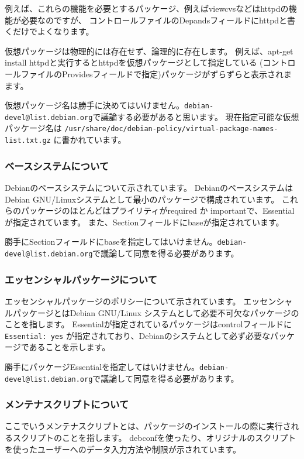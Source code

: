 \documentclass[mingoth,a4paper]{jsarticle}
\begin{document}
例えば、これらの機能を必要とするパッケージ、例えばviewcvsなどはhttpdの機能が必要なのですが、
コントロールファイルのDepandsフィールドにhttpdと書くだけでよくなります。


仮想パッケージは物理的には存在せず、論理的に存在します。
例えば、apt-get install httpdと実行するとhttpdを仮想パッケージとして指定している
(コントロールファイルのProvidesフィールドで指定)パッケージがずらずらと表示されまます。


仮想パッケージ名は勝手に決めてはいけません。{\tt debian-devel@list.debian.org}で議論する必要があると思います。
現在指定可能な仮想パッケージ名は {\tt /usr/share/doc/debian-policy/virtual-package-names-list.txt.gz} に書かれています。

\subsubsection{ベースシステムについて}
Debianのベースシステムについて示されています。
DebianのベースシステムはDebian GNU/Linuxシステムとして最小のパッケージで構成されています。
これらのパッケージのほとんどはプライリティがrequired か importantで、Essentialが指定されています。
また、Sectionフィールドにbaseが指定されています。


勝手にSectionフィールドにbaseを指定してはいけません。{\tt debian-devel@list.debian.org}で議論して同意を得る必要があります。

\subsubsection{エッセンシャルパッケージについて}
エッセンシャルパッケージのポリシーについて示されています。
エッセンシャルパッケージとはDebian GNU/Linux システムとして必要不可欠なパッケージのことを指します。
Essentialが指定されているパッケージはcontrolフィールドに {\tt Essential: yes}
が指定されており、Debianのシステムとして必ず必要なパッケージであることを示します。
		

勝手にパッケージEssentialを指定してはいけません。{\tt debian-devel@list.debian.org}で議論して同意を得る必要があります。
		
\subsubsection{メンテナスクリプトについて}
ここでいうメンテナスクリプトとは、パッケージのインストールの際に実行されるスクリプトのことを指します。
debconfを使ったり、オリジナルのスクリプトを使ったユーザーへのデータ入力方法や制限が示されています。
\end{document}
